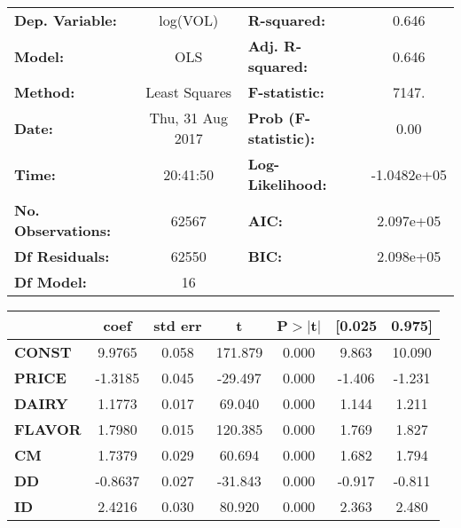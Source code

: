 \begin{center}
\begin{tabular}{lclc}
\toprule
\textbf{Dep. Variable:}    &        log(VOL)         & \textbf{  R-squared:         } &      0.646   \\
\textbf{Model:}            &       OLS        & \textbf{  Adj. R-squared:    } &      0.646   \\
\textbf{Method:}           &  Least Squares   & \textbf{  F-statistic:       } &      7147.   \\
\textbf{Date:}             & Thu, 31 Aug 2017 & \textbf{  Prob (F-statistic):} &      0.00    \\
\textbf{Time:}             &     20:41:50     & \textbf{  Log-Likelihood:    } & -1.0482e+05  \\
\textbf{No. Observations:} &       62567      & \textbf{  AIC:               } &  2.097e+05   \\
\textbf{Df Residuals:}     &       62550      & \textbf{  BIC:               } &  2.098e+05   \\
\textbf{Df Model:}         &          16      & \textbf{                     } &              \\
\bottomrule
\end{tabular}
\begin{tabular}{lcccccc}
               & \textbf{coef} & \textbf{std err} & \textbf{t} & \textbf{P$>$$|$t$|$} & \textbf{[0.025} & \textbf{0.975]}  \\
\midrule
\textbf{CONST} &       9.9765  &        0.058     &   171.879  &         0.000        &        9.863    &       10.090     \\
\textbf{PRICE}    &      -1.3185  &        0.045     &   -29.497  &         0.000        &       -1.406    &       -1.231     \\
\textbf{DAIRY}    &       1.1773  &        0.017     &    69.040  &         0.000        &        1.144    &        1.211     \\
\textbf{FLAVOR}    &       1.7980  &        0.015     &   120.385  &         0.000        &        1.769    &        1.827     \\
\textbf{CM}    &       1.7379  &        0.029     &    60.694  &         0.000        &        1.682    &        1.794     \\
\textbf{DD}    &      -0.8637  &        0.027     &   -31.843  &         0.000        &       -0.917    &       -0.811     \\
\textbf{ID}    &       2.4216  &        0.030     &    80.920  &         0.000        &        2.363    &        2.480     \\

\end{tabular}
\end{center}

